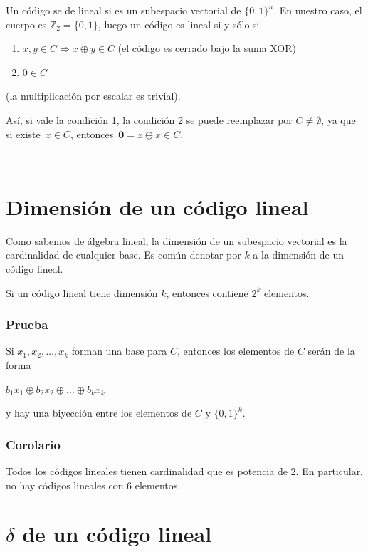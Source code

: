 \documentclass[10pt,a4paper]{article}
\begin{document}
Un código se de lineal si es un subespacio vectorial de $\{0, 1\}^n$. En nuestro caso, el cuerpo es $\mathbb{Z}_2 = \{0, 1\}$, luego un código es lineal si y sólo si

\begin{enumerate}

	\item $x, y \in C \Rightarrow x \oplus y \in C$ (el código es cerrado bajo la suma XOR)
	\item $0 \in C$
\end{enumerate}

(la multiplicación por escalar es trivial).

Así, si vale la condición 1, la condición 2 se puede reemplazar por $C \neq \emptyset$, ya que si existe $x \in C$, entonces $\textbf{0} = x \oplus x \in C$.

 

\section*{Dimensión de un código lineal}

Como sabemos de álgebra lineal, la dimensión de un subespacio vectorial es la cardinalidad de cualquier base. Es común denotar por $k$ a la dimensión de un código lineal.

Si un código lineal tiene dimensión $k$, entonces contiene $2^k$ elementos.

\subsubsection*{Prueba}

Si $x_1, x_2, \dots, x_k$ forman una base para $C$, entonces los elementos de $C$ serán de la forma

\begin{center}
$b_1x_1 \oplus
b_2x_2 \oplus
\dots \oplus
b_kx_k$
\end{center}

y hay una biyección entre los elementos de $C$ y $\{0, 1\}^k$.

\subsubsection*{Corolario}

Todos los códigos lineales tienen cardinalidad que es potencia de $2$. En particular, no hay códigos lineales con $6$ elementos.

\section*{$\delta$ de un código lineal}
\end{document}
